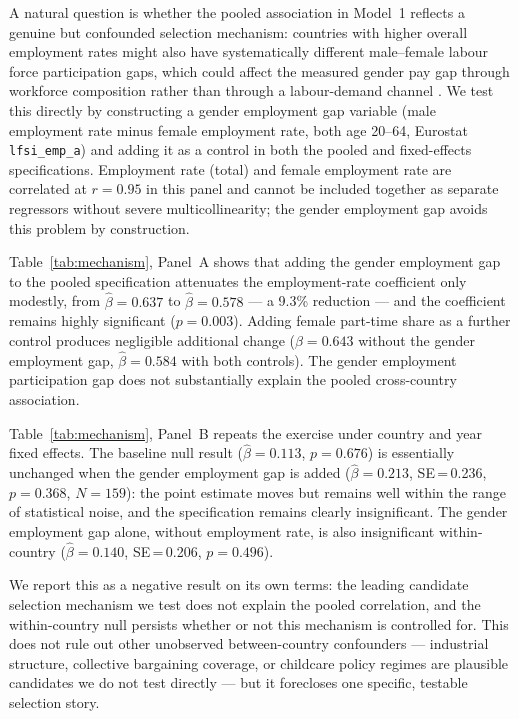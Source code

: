 \documentclass[12pt,a4paper]{article}
\begin{document}
A natural question is whether the pooled association in Model~1 reflects a
genuine but confounded selection mechanism: countries with higher overall
employment rates might also have systematically different male--female labour
force participation gaps, which could affect the measured gender pay gap through
workforce composition rather than through a labour-demand channel
\citep{OlivettiPetrongolo2008}.  We test this directly by constructing a gender
employment gap variable (male employment rate minus female employment rate, both
age 20--64, Eurostat \texttt{lfsi\_emp\_a}) and adding it as a control in both
the pooled and fixed-effects specifications.  Employment rate (total) and female
employment rate are correlated at $r=0.95$ in this panel and cannot be included
together as separate regressors without severe multicollinearity; the gender
employment gap avoids this problem by construction.

Table~\ref{tab:mechanism}, Panel~A shows that adding the gender employment gap
to the pooled specification attenuates the employment-rate coefficient only
modestly, from $\hat{\beta}=0.637$ to $\hat{\beta}=0.578$ --- a 9.3\% reduction
--- and the coefficient remains highly significant ($p=0.003$).  Adding female
part-time share as a further control produces negligible additional change
($\hat{\beta}=0.643$ without the gender employment gap, $\hat{\beta}=0.584$
with both controls).  The gender employment participation gap does not
substantially explain the pooled cross-country association.

Table~\ref{tab:mechanism}, Panel~B repeats the exercise under country and year
fixed effects.  The baseline null result ($\hat{\beta}=0.113$, $p=0.676$) is
essentially unchanged when the gender employment gap is added
($\hat{\beta}=0.213$, SE\,=\,0.236, $p=0.368$, $N=159$): the point estimate
moves but remains well within the range of statistical noise, and the
specification remains clearly insignificant.  The gender employment gap alone,
without employment rate, is also insignificant within-country
($\hat{\beta}=0.140$, SE\,=\,0.206, $p=0.496$).

We report this as a negative result on its own terms: the leading candidate
selection mechanism we test does not explain the pooled correlation, and the
within-country null persists whether or not this mechanism is controlled for.
This does not rule out other unobserved between-country confounders ---
industrial structure, collective bargaining coverage, or childcare policy regimes
are plausible candidates we do not test directly --- but it forecloses one
specific, testable selection story.
\end{document}
